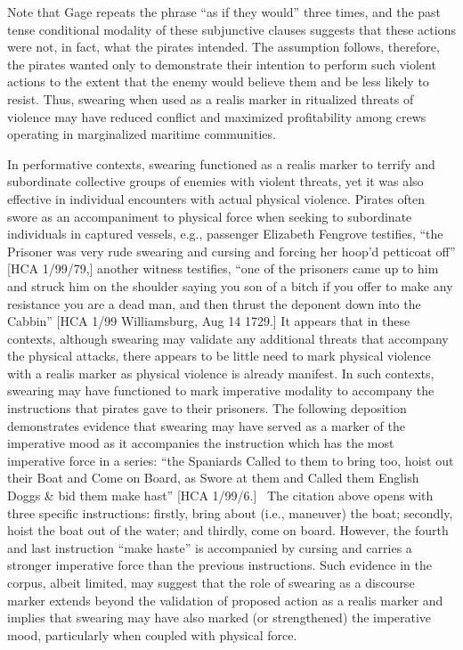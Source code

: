 Note that Gage repeats the phrase “as if they would” three times, and the past tense conditional modality of these subjunctive clauses suggests that these actions were not, in fact, what the pirates intended. The assumption follows, therefore, the pirates wanted only to demonstrate their intention to perform such violent actions to the extent that the enemy would believe them and be less likely to resist. Thus, swearing when used as a realis marker in ritualized threats of violence may have reduced conflict and maximized profitability among crews operating in marginalized maritime communities. 

In performative contexts, swearing functioned as a realis marker to terrify and subordinate collective groups of enemies with violent threats, yet it was also effective in individual encounters with actual physical violence. Pirates often swore as an accompaniment to physical force when seeking to subordinate individuals in captured vessels, e.g., passenger Elizabeth Fengrove testifies, “the Prisoner was very rude swearing and cursing and forcing her hoop’d petticoat off” [HCA 1/99/79,] another witness testifies, “one of the prisoners came up to him and struck him on the shoulder saying you son of a bitch if you offer to make any resistance you are a dead man, and then thrust the deponent down into the Cabbin” [HCA 1/99 Williamsburg, Aug 14 1729.] It appears that in these contexts, although swearing may validate any additional threats that accompany the physical attacks, there appears to be little need to mark physical violence with a realis marker as physical violence is already manifest. In such contexts, swearing may have functioned to mark imperative modality to accompany the instructions that pirates gave to their prisoners. The following deposition demonstrates evidence that swearing may have served as a marker of the imperative mood as it accompanies the instruction which has the most imperative force in a series: “the Spaniards Called to them to bring too, hoist out their Boat and Come on Board, as Swore at them and Called them English Doggs \& bid them make hast” [HCA 1/99/6.] ~The citation above opens with three specific instructions: firstly, bring about (i.e., maneuver) the boat; secondly, hoist the boat out of the water; and thirdly, come on board. However, the fourth and last instruction “make haste” is accompanied by cursing and carries a stronger imperative force than the previous instructions. Such evidence in the corpus, albeit limited, may suggest that the role of swearing as a discourse marker extends beyond the validation of proposed action as a realis marker and implies that swearing may have also marked (or strengthened) the imperative mood, particularly when coupled with physical force. 

